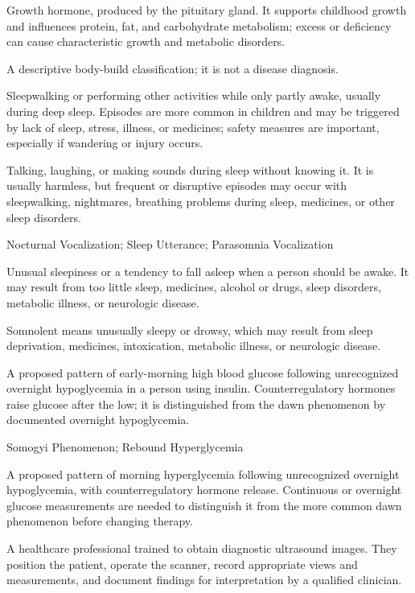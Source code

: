  Growth hormone, produced by the pituitary gland. It supports childhood growth and influences protein, fat, and carbohydrate metabolism; excess or deficiency can cause characteristic growth and metabolic disorders.

 A descriptive body-build classification; it is not a disease diagnosis.

 Sleepwalking or performing other activities while only partly awake, usually during deep sleep. Episodes are more common in children and may be triggered by lack of sleep, stress, illness, or medicines; safety measures are important, especially if wandering or injury occurs.

 Talking, laughing, or making sounds during sleep without knowing it. It is usually harmless, but frequent or disruptive episodes may occur with sleepwalking, nightmares, breathing problems during sleep, medicines, or other sleep disorders.

\synonyms
Nocturnal Vocalization; Sleep Utterance; Parasomnia Vocalization

 Unusual sleepiness or a tendency to fall asleep when a person should be awake. It may result from too little sleep, medicines, alcohol or drugs, sleep disorders, metabolic illness, or neurologic disease.

 Somnolent means unusually sleepy or drowsy, which may result from sleep deprivation, medicines, intoxication, metabolic illness, or neurologic disease.

 A proposed pattern of early-morning high blood glucose following unrecognized overnight hypoglycemia in a person using insulin. Counterregulatory hormones raise glucose after the low; it is distinguished from the dawn phenomenon by documented overnight hypoglycemia.

\synonyms
Somogyi Phenomenon; Rebound Hyperglycemia

 A proposed pattern of morning hyperglycemia following unrecognized overnight hypoglycemia, with counterregulatory hormone release. Continuous or overnight glucose measurements are needed to distinguish it from the more common dawn phenomenon before changing therapy.

 A healthcare professional trained to obtain diagnostic ultrasound images. They position the patient, operate the scanner, record appropriate views and measurements, and document findings for interpretation by a qualified clinician.


